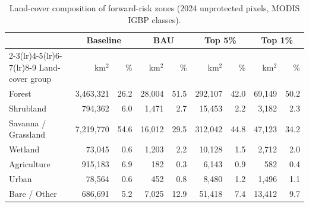 \begin{table}[htbp]
  \centering
  \small
  \caption{Land-cover composition of forward-risk zones (2024 unprotected pixels, MODIS IGBP classes).}
  \label{tab:landcover_exposure}
  \begin{tabular}{lrrrrrrrr}
    \toprule
    & \multicolumn{2}{c}{Baseline} & \multicolumn{2}{c}{BAU} & \multicolumn{2}{c}{Top 5\%} & \multicolumn{2}{c}{Top 1\%} \\
    \cmidrule(lr){2-3}\cmidrule(lr){4-5}\cmidrule(lr){6-7}\cmidrule(lr){8-9}
    Land-cover group & km$^2$ & \% & km$^2$ & \% & km$^2$ & \% & km$^2$ & \% \\
    \midrule
    Forest & 3,463,321 & 26.2 & 28,004 & 51.5 & 292,107 & 42.0 & 69,149 & 50.2 \\
    Shrubland & 794,362 & 6.0 & 1,471 & 2.7 & 15,453 & 2.2 & 3,182 & 2.3 \\
    Savanna / Grassland & 7,219,770 & 54.6 & 16,012 & 29.5 & 312,042 & 44.8 & 47,123 & 34.2 \\
    Wetland & 73,045 & 0.6 & 1,203 & 2.2 & 10,128 & 1.5 & 2,712 & 2.0 \\
    Agriculture & 915,183 & 6.9 & 182 & 0.3 & 6,143 & 0.9 & 582 & 0.4 \\
    Urban & 78,564 & 0.6 & 452 & 0.8 & 8,480 & 1.2 & 1,496 & 1.1 \\
    Bare / Other & 686,691 & 5.2 & 7,025 & 12.9 & 51,418 & 7.4 & 13,412 & 9.7 \\
    \bottomrule
  \end{tabular}
\end{table}
